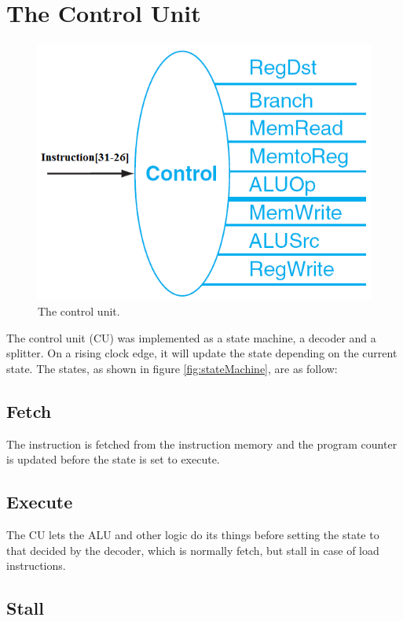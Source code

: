 \section{The Control Unit}
\begin{figure}[ht]
    \centering
    \includegraphics[scale=0.3]{figures/controlunit.png}
    \caption{\label{fig:controlUnit}The control unit.}
\end{figure}

The control unit (CU) was implemented as a state machine, a decoder and a
splitter. On a rising clock edge, it will update the state depending on the
current state. The states, as shown in figure \ref{fig:stateMachine}, are as follow:

\subsection{Fetch}

The instruction is fetched from the instruction memory and the program counter
is updated before the state is set to execute.

\subsection{Execute}

The CU lets the ALU and other logic do its things before setting the state to
that decided by the decoder, which is normally fetch, but stall in case of load
instructions.

\subsection{Stall}

